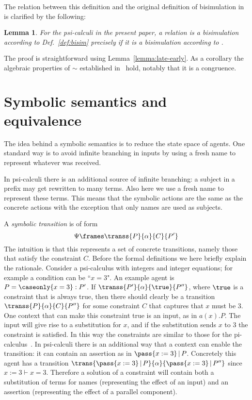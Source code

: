 \documentclass{eptcs}
\newtheorem{lemma}[definition]{Lemma}
\theoremstyle{definition}
\begin{document}
The relation between this definition and the original definition of bisimulation in~\cite{bengtson.johansson.ea:psi-calculi} is clarified by the following:

\begin{lemma}
For the psi-calculi in the present paper, a relation is a bisimulation according to Def.~\ref{def:bisim} precisely if it is a bisimulation according to \cite{bengtson.johansson.ea:psi-calculi}.
\end{lemma}
The proof is straightforward using Lemma~\ref{lemma:late-early}. As a corollary
the algebraic properties of $\sim$ established
in~\cite{bengtson.johansson.ea:psi-calculi} hold, notably that it is a
congruence.

\section{Symbolic semantics and equivalence}
\label{sec:symbolic}
The idea behind a symbolic semantics is to reduce the state space of agents. One
standard way is to avoid infinite branching in inputs by 
using a fresh name to represent whatever was received.

In psi-calculi there is an additional source of infinite branching:  a subject  
in a prefix may get rewritten
to many terms. Also here we use a fresh name to represent these terms.
This means that the symbolic actions are the same as
the concrete actions with the exception that only names are used as subjects.

 
A {\em symbolic transition} is of form 
\[\Psi \frames \transs{P}{\alpha}{C}{P'}\]
The intuition is that this represents a set of concrete transitions,
namely those that satisfy the constraint $C$. Before the formal
definitions we here briefly explain the rationale. Consider a
psi-calculus with integers and integer equations; for example a
condition can be ``$x=3$". An example agent is 
$P=\caseonly{x=3}:P'$.
If $\transs{P'}{\alpha}{\true}{P''}$, where $\true$ is a constraint that is
always true, then there should clearly be
a transition
$\transs{P}{\alpha}{C}{P''}$ for some constraint $C$ that captures
that
$x$ must be 3. One
context that can make
this constraint true is an
input, as in $a(x).P$. The input will give rise to a substitution for
$x$, and if the substitution sends $x$ to 3 the constraint is
satisfied. 
In this way the constraints are similar to those for the pi-calculus~\cite{boreale.de-nicola:symbolic-semantics,lin:symbolic-transition}.
In psi-calculi there is an additional way that a context
can enable the transition: it can contain an assertion as in
$\pass{x:=3}\,|\,P$. Concretely this agent has a
transition
$\trans{\pass{x:=3}\,|\,P}{\alpha}{\pass{x:=3}\,|\,P''}$ since $x:=3 \vdash
x=3$. 
Therefore a solution of a constraint will 
contain both a substitution of terms for names (representing the
effect of an input) and an assertion (representing the effect of a
parallel component).
\end{document}
